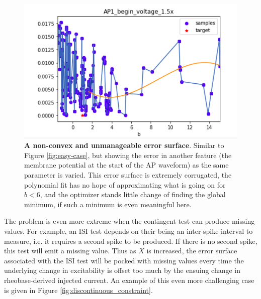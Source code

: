 \begin{figure}
\centering
      \includegraphics[scale=0.85]{figures/parameter_b_hopeless_surface.png}
      \caption[A non-convex and unmanageable error surface (1)]{\textbf{A non-convex and unmanageable error surface}.
      Similar to Figure \ref{fig:easy-case}, but showing the error in another feature (the membrane potential at the start of the AP waveform) as the same parameter is varied.
      This error surface is extremely corrugated, the polynomial fit has no hope of approximating what is going on for $b<6$, and the optimizer stands little change of finding the global minimum, if such a minimum is even meaningful here.
    }
      \label{fig:probably_smooth_constraint}
\end{figure}

The problem is even more extreme when the contingent test can produce missing values.
For example, an ISI test depends on their being an inter-spike interval to measure, i.e. it requires a second spike to be produced.
If there is no second spike, this test will emit a missing value.
Thus as $X$ is increased, the error surface associated with the ISI test will be pocked with missing values every time the underlying change in excitability is offset too much by the ensuing change in rheobase-derived injected current.
An example of this even more challenging case is given in Figure \ref{fig:discontinuous_constraint}.

